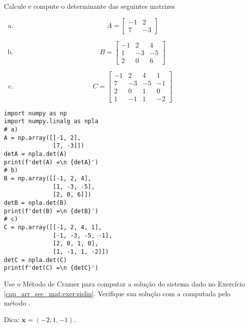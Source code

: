 \begin{exer}
  Calcule e compute o determinante das seguintes matrizes
  \begin{enumerate}[a)]
  \item
    \begin{equation}
      A =
      \begin{bmatrix}
        -1 & 2\\
        7 & -3
      \end{bmatrix}
    \end{equation}
  \item
    \begin{equation}
      B =
      \begin{bmatrix}
        -1 & 2 & 4\\
        1 & -3 & -5\\
        2 & 0 & 6
      \end{bmatrix}
    \end{equation}
  \item
    \begin{equation}
      C =
      \begin{bmatrix}
        -1 & 2 & 4 & 1\\
        7 & -3 & -5 & -1\\
        2 & 0 & 1 & 0\\
        1 & -1 & 1 & -2
      \end{bmatrix}
    \end{equation}
  \end{enumerate}
\end{exer}
\begin{resp}

\begin{lstlisting}
import numpy as np
import numpy.linalg as npla
# a)
A = np.array([[-1, 2],
              [7, -3]])
detA = npla.det(A)
print(f'det(A) =\n {detA}')
# b)
B = np.array([[-1, 2, 4],
              [1, -3, -5],
              [2, 0, 6]])
detB = npla.det(B)
print(f'det(B) =\n {detB}')
# c)
C = np.array([[-1, 2, 4, 1],
              [-1, -3, -5, -1],
              [2, 0, 1, 0],
              [1, -1, 1, -2]])
detC = npla.det(C)
print(f'det(C) =\n {detC}')
\end{lstlisting}

\end{resp}

\begin{exer}
  Use o Método de Cramer para computar a solução do sistema dado no Exercício \ref{cap_arr_sec_mat:exer:sislin}. Verifique sua solução com a computada pelo método {\PYTHONnumpyDOTlinalgDOTsolve}.
\end{exer}
\begin{resp}
  Dica: $\pmb{x} = (-2, 1, -1)$.
\end{resp}

